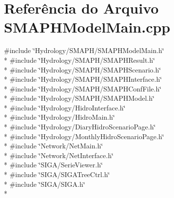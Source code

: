\section{Referência do Arquivo S\+M\+A\+P\+H\+Model\+Main.\+cpp}
\label{_s_m_a_p_h_model_main_8cpp}
{\ttfamily \#include \char`\"{}Hydrology/\+S\+M\+A\+P\+H/\+S\+M\+A\+P\+H\+Model\+Main.\+h\char`\"{}}\\*
{\ttfamily \#include \char`\"{}Hydrology/\+S\+M\+A\+P\+H/\+S\+M\+A\+P\+H\+Result.\+h\char`\"{}}\\*
{\ttfamily \#include \char`\"{}Hydrology/\+S\+M\+A\+P\+H/\+S\+M\+A\+P\+H\+Scenario.\+h\char`\"{}}\\*
{\ttfamily \#include \char`\"{}Hydrology/\+S\+M\+A\+P\+H/\+S\+M\+A\+P\+H\+Interface.\+h\char`\"{}}\\*
{\ttfamily \#include \char`\"{}Hydrology/\+S\+M\+A\+P\+H/\+S\+M\+A\+P\+H\+Conf\+File.\+h\char`\"{}}\\*
{\ttfamily \#include \char`\"{}Hydrology/\+S\+M\+A\+P\+H/\+S\+M\+A\+P\+H\+Model.\+h\char`\"{}}\\*
{\ttfamily \#include \char`\"{}Hydrology/\+Hidro\+Interface.\+h\char`\"{}}\\*
{\ttfamily \#include \char`\"{}Hydrology/\+Hidro\+Main.\+h\char`\"{}}\\*
{\ttfamily \#include \char`\"{}Hydrology/\+Diary\+Hidro\+Scenario\+Page.\+h\char`\"{}}\\*
{\ttfamily \#include \char`\"{}Hydrology/\+Monthly\+Hidro\+Scenario\+Page.\+h\char`\"{}}\\*
{\ttfamily \#include \char`\"{}Network/\+Net\+Main.\+h\char`\"{}}\\*
{\ttfamily \#include \char`\"{}Network/\+Net\+Interface.\+h\char`\"{}}\\*
{\ttfamily \#include \char`\"{}S\+I\+G\+A/\+Serie\+Viewer.\+h\char`\"{}}\\*
{\ttfamily \#include \char`\"{}S\+I\+G\+A/\+S\+I\+G\+A\+Tree\+Ctrl.\+h\char`\"{}}\\*
{\ttfamily \#include \char`\"{}S\+I\+G\+A/\+S\+I\+G\+A.\+h\char`\"{}}\\*
